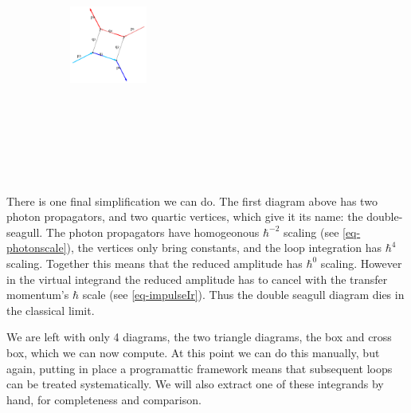 \documentclass[
  10pt,
  a4paper,
  DIV=11,
  numbers=noendperiod,
  twoside]{scrreprt}
\DeclareRobustCommand{\[}{\begin{equation}}
\DeclareRobustCommand{\]}{\end{equation}}
\begin{document}
\begin{figure}
\begin{minipage}[t]{0.20\linewidth}
{\begin{figure}[H]
{}

\end{figure}

}

\end{minipage}%
%
\begin{minipage}[t]{0.20\linewidth}

{\centering 

\begin{figure}[H]

{\centering \includegraphics[width=1in,height=3.5in]{./scattering_files/figure-latex/dot-figure-2.png}

}

\end{figure}

}

\end{minipage}%

\end{figure}

There is one final simplification we can do. The first diagram above has
two photon propagators, and two quartic vertices, which give it its
name: the double-seagull. The photon propagators have homogeonous
\(\hbar^{-2}\) scaling (see \ref{eq-photonscale}), the vertices only
bring constants, and the loop integration has \(\hbar^4\) scaling.
Together this means that the reduced amplitude has \(\hbar^0\) scaling.
However in the virtual integrand the reduced amplitude has to cancel
with the transfer momentum's \(\hbar\) scale (see \ref{eq-impulseIr}).
Thus the double seagull diagram dies in the classical limit.

We are left with only 4 diagrams, the two triangle diagrams, the box and
cross box, which we can now compute. At this point we can do this
manually, but again, putting in place a programattic framework means
that subsequent loops can be treated systematically. We will also extract one of these integrands
by hand, for completeness and comparison.
\end{document}
